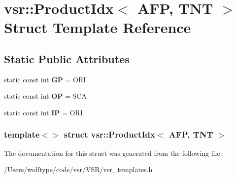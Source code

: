 \hypertarget{structvsr_1_1_product_idx_3_01_a_f_p_00_01_t_n_t_01_4}{\section{vsr\-:\-:Product\-Idx$<$ A\-F\-P, T\-N\-T $>$ Struct Template Reference}
\label{structvsr_1_1_product_idx_3_01_a_f_p_00_01_t_n_t_01_4}
}
\subsection*{Static Public Attributes}
\begin{DoxyCompactItemize}
\item 
\hypertarget{structvsr_1_1_product_idx_3_01_a_f_p_00_01_t_n_t_01_4_a68997315da66e7949d9a1f2c96e4e2b8}{static const int {\bfseries G\-P} = O\-R\-I}\label{structvsr_1_1_product_idx_3_01_a_f_p_00_01_t_n_t_01_4_a68997315da66e7949d9a1f2c96e4e2b8}

\item 
\hypertarget{structvsr_1_1_product_idx_3_01_a_f_p_00_01_t_n_t_01_4_a773a5d577eda2ea881ddf10fabead2ba}{static const int {\bfseries O\-P} = S\-C\-A}\label{structvsr_1_1_product_idx_3_01_a_f_p_00_01_t_n_t_01_4_a773a5d577eda2ea881ddf10fabead2ba}

\item 
\hypertarget{structvsr_1_1_product_idx_3_01_a_f_p_00_01_t_n_t_01_4_a82f1575661adafe2586343c779624c6c}{static const int {\bfseries I\-P} = O\-R\-I}\label{structvsr_1_1_product_idx_3_01_a_f_p_00_01_t_n_t_01_4_a82f1575661adafe2586343c779624c6c}

\end{DoxyCompactItemize}
\subsubsection*{template$<$$>$ struct vsr\-::\-Product\-Idx$<$ A\-F\-P, T\-N\-T $>$}



The documentation for this struct was generated from the following file\-:\begin{DoxyCompactItemize}
\item 
/\-Users/wolftype/code/vsr/\-V\-S\-R/vsr\-\_\-templates.\-h\end{DoxyCompactItemize}
